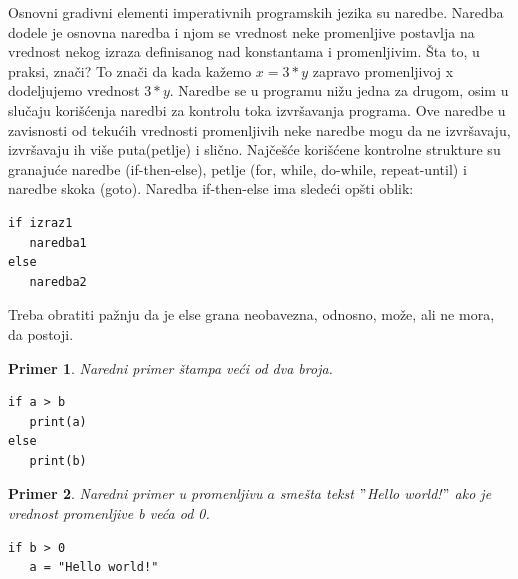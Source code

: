 \documentclass[a4paper]{article}
\newtheorem{primer}{Primer}[section]
\begin{document}
Osnovni gradivni elementi imperativnih programskih jezika su naredbe.
Naredba dodele je osnovna naredba i njom se vrednost neke promenljive postavlja na vrednost nekog izraza definisanog nad konstantama i promenljivim. Šta to, u praksi, znači? To znači da kada kažemo $x = 3*y$ zapravo promenljivoj x dodeljujemo vrednost $3*y$. Naredbe se u programu nižu jedna za drugom, osim u slučaju korišćenja naredbi za kontrolu toka izvršavanja programa. Ove naredbe u zavisnosti od tekućih
vrednosti promenljivih neke naredbe mogu da ne izvršavaju, izvršavaju ih više puta(petlje) i slično. Najčešće korišćene kontrolne strukture su granajuće naredbe (if-then-else), petlje (for, while, do-while, repeat-until) i naredbe skoka (goto). Naredba if-then-else ima sledeći opšti oblik:
\begin{lstlisting}[backgroundcolor = \color{lightgray}]
if izraz1 
   naredba1
else 
   naredba2
\end{lstlisting}
Treba obratiti pažnju da je else grana neobavezna, odnosno, može, ali ne mora, da postoji. 
\begin{primer}
Naredni primer štampa veći od dva broja.
\begin{lstlisting}[backgroundcolor = \color{lightgray}]
if a > b
   print(a)
else
   print(b)
\end{lstlisting}
\end{primer}

\begin{primer}
Naredni primer u promenljivu $a$ smešta tekst $"$Hello world!$"$ ako je vrednost promenljive b veća od 0.
\begin{lstlisting}[backgroundcolor = \color{lightgray}]
if b > 0
   a = "Hello world!"
\end{lstlisting}
\end{primer}
\end{document}
